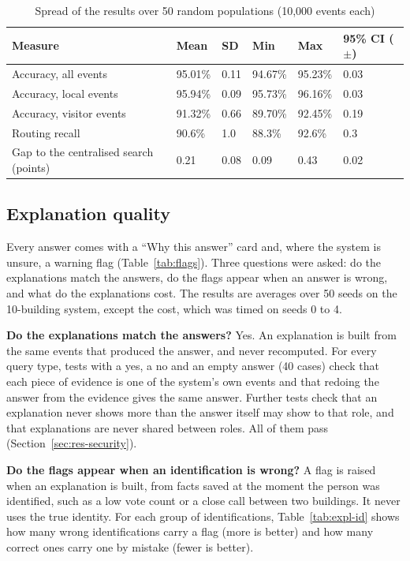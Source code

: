 \documentclass[12pt,a4paper,oneside]{report}
\begin{document}
\begin{table}[htbp]
\centering
\caption{Spread of the results over 50 random populations (10,000 events each)}\label{tab:seeds}
{\small\setlength{\tabcolsep}{4pt}\renewcommand{\arraystretch}{1.2}
\begin{tabular}{|p{4.2cm}|p{1.9cm}|p{1.9cm}|p{1.9cm}|p{1.9cm}|p{2.4cm}|}\hline
\textbf{Measure} & \textbf{Mean} & \textbf{SD} & \textbf{Min} & \textbf{Max} & \textbf{95\% CI ($\pm$)}\\\hline
Accuracy, all events & 95.01\% & 0.11 & 94.67\% & 95.23\% & 0.03\\\hline
Accuracy, local events & 95.94\% & 0.09 & 95.73\% & 96.16\% & 0.03\\\hline
Accuracy, visitor events & 91.32\% & 0.66 & 89.70\% & 92.45\% & 0.19\\\hline
Routing recall & 90.6\% & 1.0 & 88.3\% & 92.6\% & 0.3\\\hline
Gap to the centralised search (points) & 0.21 & 0.08 & 0.09 & 0.43 & 0.02\\\hline
\end{tabular}}
\end{table}

\subsection{Explanation quality}\label{sec:res-expl}
Every answer comes with a ``Why this answer'' card and, where the system is unsure, a warning flag (Table~\ref{tab:flags}). Three questions were asked: do the explanations match the answers, do the flags appear when an answer is wrong, and what do the explanations cost. The results are averages over 50 seeds on the 10-building system, except the cost, which was timed on seeds 0 to 4.

\textbf{Do the explanations match the answers?} Yes. An explanation is built from the same events that produced the answer, and never recomputed. For every query type, tests with a yes, a no and an empty answer (40 cases) check that each piece of evidence is one of the system's own events and that redoing the answer from the evidence gives the same answer. Further tests check that an explanation never shows more than the answer itself may show to that role, and that explanations are never shared between roles. All of them pass (Section~\ref{sec:res-security}).

\textbf{Do the flags appear when an identification is wrong?} A flag is raised when an explanation is built, from facts saved at the moment the person was identified, such as a low vote count or a close call between two buildings. It never uses the true identity. For each group of identifications, Table~\ref{tab:expl-id} shows how many wrong identifications carry a flag (more is better) and how many correct ones carry one by mistake (fewer is better).
\end{document}
